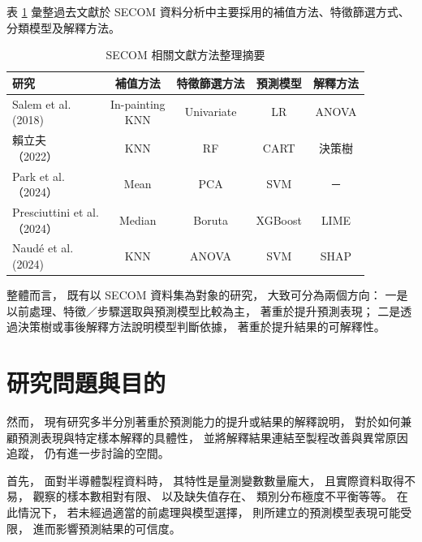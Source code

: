 \documentclass[12pt,a4paper,oneside]{book}
\begin{document}
	表 \ref{tab:文獻比較} 彙整過去文獻於 SECOM 資料分析中主要採用的補值方法、特徵篩選方式、分類模型及解釋方法。
	\begin{table}[H]
		\centering
		\caption{SECOM 相關文獻方法整理摘要}
		\vspace{0.15cm}
		\label{tab:文獻比較}
		\begin{tabular}{|l|c|c|c|c|}
			\hline
			研究                                    & 補值方法                       & 特徵篩選方法 & 預測模型 & 解釋方法 \\
			\hline
			\makecell{Salem et al.\\(2018)}         & \makecell{In-painting \\ KNN} & Univariate & LR       & ANOVA   \\
			\hline
			\makecell{賴立夫\\（2022）}              & KNN                           & RF         & CART     & 決策樹   \\
			\hline
			\makecell{Park et al.\\（2024）}         & Mean                          & PCA        & SVM     & －       \\
			\hline
			\makecell{Presciuttini et al.\\（2024）} & Median                        & Boruta     & XGBoost & LIME     \\
			\hline
			\makecell{Naudé et al.\\(2024)}          & KNN                           & ANOVA      & SVM     & SHAP     \\
			\hline
		\end{tabular}
	\end{table}

	整體而言，
	既有以 SECOM 資料集為對象的研究，
	大致可分為兩個方向：
	一是以前處理、特徵／步驟選取與預測模型比較為主，
	著重於提升預測表現；
	二是透過決策樹或事後解釋方法說明模型判斷依據，
	著重於提升結果的可解釋性。

	\section{研究問題與目的}
	
	然而，
	現有研究多半分別著重於預測能力的提升或結果的解釋說明，
	對於如何兼顧預測表現與特定樣本解釋的具體性，
	並將解釋結果連結至製程改善與異常原因追蹤，
	仍有進一步討論的空間。

	首先，
	面對半導體製程資料時，
	其特性是量測變數數量龐大，
	且實際資料取得不易，
	觀察的樣本數相對有限、
	以及缺失值存在、
	類別分布極度不平衡等等。
	在此情況下，
	若未經過適當的前處理與模型選擇，
	則所建立的預測模型表現可能受限，
	進而影響預測結果的可信度。
\end{document}
